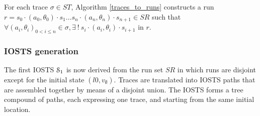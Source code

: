 \begin{proposition}
    For each trace $\sigma \in ST$, Algorithm \ref{traces_to_runs}
    constructs a run $r=s_0 \cdot (a_0,\theta_0) \cdot s_1 \dots
    s_n \cdot (a_n,\theta_n) \cdot s_{n+1} \in SR$ such that
    $\forall (a_i,\theta_i)_{0<i\leq n} \in \sigma, \exists ~!~ s_i
    \cdot (a_i,\theta_i) \cdot s_{i+1}$ in $r$.
\end{proposition}


\subsubsection{IOSTS generation}
\label{sec:iosts-gen}

The first IOSTS $\EuScript{S}_1$ is now derived from the run set
$SR$ in which runs are disjoint except for the initial state
$(l0,v_\emptyset)$. Traces are translated into IOSTS paths that
are assembled together by means of a disjoint union. The IOSTS
forms a tree compound of paths, each expressing one trace, and
starting from the same initial location.


